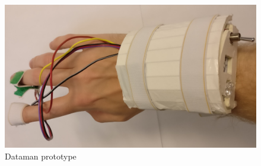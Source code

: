 \begin{figure}
    \centering
    \includegraphics[width = \textwidth]{Pictures/Dataman.jpg}
    \caption{Dataman prototype}
    \label{fig:Dataman}
\end{figure}

